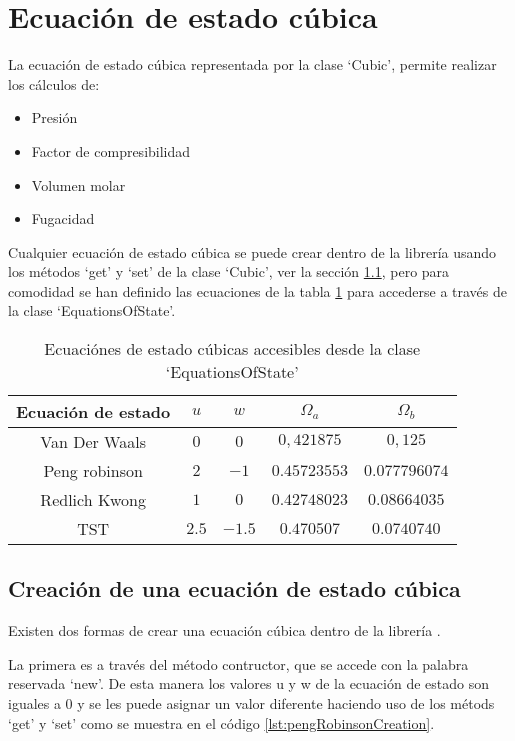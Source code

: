 \section{Ecuación de estado cúbica}\label{sec:cubic}

	La ecuación de estado cúbica representada por la clase `Cubic', permite realizar los cálculos de: 
	\begin{itemize}
	\itemsep0ex
		\item{Presión} 
		\item{Factor de compresibilidad}
		\item{Volumen molar}
		\item{Fugacidad}
	\end{itemize}

	Cualquier ecuación de estado cúbica se puede crear dentro de la librería \Materia usando los métodos `get' y `set' de la clase `Cubic', ver la sección \ref{subsec:cubicCreation}, pero para comodidad se han definido las ecuaciones de la tabla \ref{tab:cubics} para accederse a través de la clase `EquationsOfState'.

	\begin{table}[!h]
		\centering
		\caption{Ecuaciónes de estado cúbicas accesibles desde la clase `EquationsOfState'}\label{tab:cubics}
		\begin{tabular}{|c |c | c | c | c |}
			\hline
			Ecuación de estado  & $u$ & $w$ & $\Omega_a$&$\Omega_b$\\
			\hline
			Van Der Waals  & $0$ & $0$ & $0,421875$ & $0,125$\\
			\hline
			Peng robinson  & $2$ & $-1$ & $0.45723553$ & $0.077796074$\\
			\hline
			Redlich Kwong  & $1$ & $0$ & $0.42748023$ & $0.08664035$\\
			\hline
			TST  & $2.5$ & $-1.5$ &$ 0.470507$ & $0.0740740$\\
			\hline
		\end{tabular}		
	\end{table}

\subsection{Creación de una ecuación de estado cúbica}\label{subsec:cubicCreation}

	Existen dos formas de crear una ecuación cúbica dentro de la librería \Materia.

	La primera es a través del método contructor, que se accede con la palabra reservada  `new'. De esta manera los valores u y w de la ecuación de estado son iguales a 0 y se les puede asignar un valor diferente haciendo uso de los métods `get' y `set' como se muestra en el código \ref{lst:pengRobinsonCreation}.

